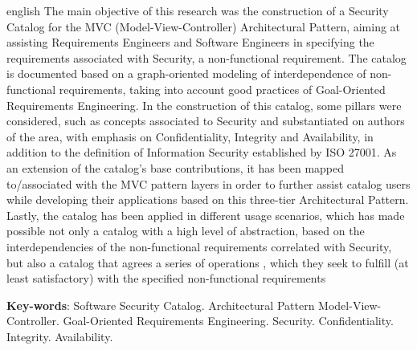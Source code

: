\begin{resumo}[Abstract]
 \begin{otherlanguage*}{english}
   The main objective of this research was the construction of a Security Catalog for the MVC (Model-View-Controller) Architectural Pattern, 
   aiming at assisting Requirements Engineers and Software Engineers in specifying the requirements associated with Security, a non-functional requirement. The catalog is documented based on a graph-oriented modeling of interdependence of non-functional requirements, taking into account good practices of Goal-Oriented Requirements Engineering. In the construction of this catalog, some pillars were considered, such as concepts associated to Security and substantiated on authors of the area, with emphasis on Confidentiality, Integrity and Availability, in addition to the definition of Information Security established by ISO 27001. As an extension of the catalog's base contributions, it has been mapped to/associated with the MVC pattern layers in order to further assist catalog users while developing their applications based on this three-tier Architectural Pattern. Lastly, the catalog has been applied in different usage scenarios, which has made possible not only a catalog with a high level of abstraction, based on the interdependencies of the non-functional requirements correlated with Security, but also a catalog that agrees a series of operations , which they seek to fulfill (at least satisfactory) with the specified non-functional requirements

   \vspace{\onelineskip}
 
   \noindent 
   \textbf{Key-words}: Software Security Catalog. Architectural Pattern Model-View-Controller. Goal-Oriented Requirements Engineering. Security. Confidentiality. Integrity. Availability. 
 \end{otherlanguage*}
\end{resumo}
